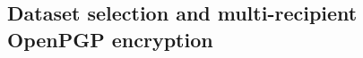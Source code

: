 \documentclass[a4paper,UKenglish,cleveref,autoref,thm-restate]{lipics-v2021}
\begin{document}




\FloatBarrier
\subsection{Dataset selection and multi-recipient OpenPGP encryption}
\label{sec:encryption}
\end{document}
